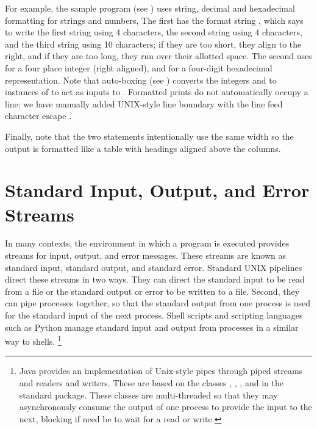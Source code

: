 For example, the sample program  (see
) uses string, decimal and hexadecimal
formatting for strings and numbers,
%
%
The first  has the format string
, which says to write the first string
using 4 characters, the second string using 4 characters, and the
third string using 10 characters; if they are too short, they align to
the right, and if they are too long, they run over their allotted
space.  The second  uses  for a four place
integer (right aligned), and  for a four-digit hexadecimal
representation.  Note that auto-boxing (see )
converts the integers  and  to instances of
 to act as inputs to .  Formatted prints
do not automatically occupy a line; we have manually added UNIX-style
line boundary with the line feed character escape .

Finally, note that the two  statements
intentionally use the same width so the output is formatted like a table
with headings aligned above the columns.  


\section{Standard Input, Output, and Error Streams}\label{section:io-stdin-stdout}

In many contexts, the environment in which a program is executed
provides streams for input, output, and error messages.  These streams
are known as standard input, standard output, and standard error.
Standard UNIX pipelines direct these streams in two ways.  They can
direct the standard input to be read from a file or the standard
output or error to be written to a file.  Second, they can pipe
processes together, so that the standard output from one process is
used for the standard input of the next process.
Shell scripts and scripting languages such as Python manage standard
input and output from processes in a similar way to shells.%
%
\footnote{Java provides an implementation of Unix-style pipes through
  piped streams and readers and writers.  These are based on the
  classes , ,
  , and  in the standard
   package.  These classes are multi-threaded so that
  they may asynchronously consume the output of one process to provide
  the input to the next, blocking if need be to wait for a read or write.}
%

